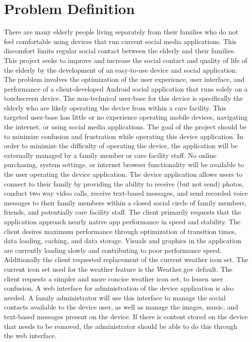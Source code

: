 \documentclass[letterpaper,10pt,draftclsnofoot,onecolumn]{IEEEtran}
\begin{document}
\section*{Problem Definition}
There are many elderly people living separately from their families who do not feel comfortable using devices that run current social media applications. This discomfort limits regular social contact between the elderly and their families. This project seeks to improve and increase the social contact and quality of life of the elderly by the development of an easy-to-use device and social application.
\bigbreak
The problem involves the optimization of the user experience, user interface, and performance of a client-developed Android social application that runs solely on a touchscreen device. The non-technical user-base for this device is specifically the elderly who are likely operating the device from within a care facility. This targeted user-base has little or no experience operating mobile devices, navigating the internet, or using social media applications. 
\bigbreak
The goal of the project should be to minimize confusion and frustration while operating this device application. In order to minimize the difficulty of operating the device, the application will be externally managed by a family member or care facility staff. No online purchasing, system settings, or internet browser functionality will be available to the user operating the device application. The device application allows users to connect to their family by providing the ability to receive (but not send) photos, conduct two way video calls, receive text-based messages, and send recorded voice messages to their family members within a closed social circle of family members, friends, and potentially care facility staff.
\bigbreak
The client primarily requests that the application approach nearly native app performance in speed and stability. The client desires maximum performance through optimization of transition times, data loading, caching, and data storage. Visuals and graphics in the application are currently loading slowly and contributing to poor performance speed. 
\bigbreak
Additionally the client requested replacement of the current weather icon set. The current icon set used for the weather feature is the Weather.gov default. The client requests a simpler and more concise weather icon set, to lessen user confusion.
\bigbreak
A web interface for administration of the device application is also needed. A family administrator will use this interface to manage the social contacts available to the device user, as well as manage the images, music, and text-based messages present on the device. If there is content stored on the device that needs to be removed, the administrator should be able to do this through the web interface.
\end{document}
